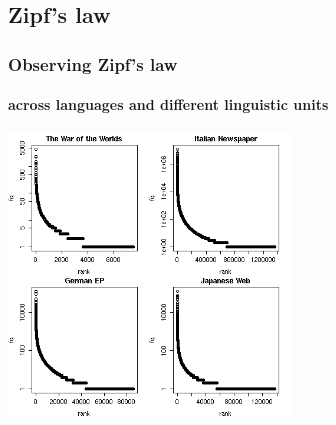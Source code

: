 \documentclass[t]{beamer} %
\begin{document}
\subsection{Zipf's law}

\begin{frame}
  \frametitle{Observing Zipf's law}
  \framesubtitle{across languages and different linguistic units}

  \ungap[1.5]
  \begin{center}
    \includegraphics[height=7.5cm]{img/othercorporarf}
  \end{center}
\end{frame}
\end{document}
